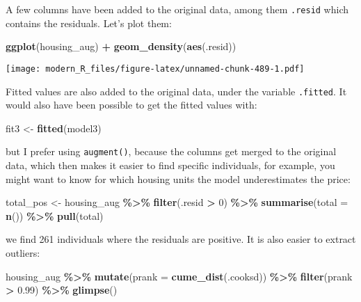 \documentclass[
]{article}
\newenvironment{Shaded}{\begin{snugshade}}{\end{snugshade}}
\newcommand{\DataTypeTok}[1]{\textcolor[rgb]{0.13,0.29,0.53}{#1}}
\newcommand{\DecValTok}[1]{\textcolor[rgb]{0.00,0.00,0.81}{#1}}
\newcommand{\FloatTok}[1]{\textcolor[rgb]{0.00,0.00,0.81}{#1}}
\newcommand{\KeywordTok}[1]{\textcolor[rgb]{0.13,0.29,0.53}{\textbf{#1}}}
\newcommand{\NormalTok}[1]{#1}
\newcommand{\OperatorTok}[1]{\textcolor[rgb]{0.81,0.36,0.00}{\textbf{#1}}}
\newcommand{\StringTok}[1]{\textcolor[rgb]{0.31,0.60,0.02}{#1}}
\begin{document}
A few columns have been added to the original data, among them \texttt{.resid} which contains the
residuals. Let's plot them:

\begin{Shaded}
\begin{Highlighting}[]
\KeywordTok{ggplot}\NormalTok{(housing\_aug) }\OperatorTok{+}
\StringTok{  }\KeywordTok{geom\_density}\NormalTok{(}\KeywordTok{aes}\NormalTok{(.resid))}
\end{Highlighting}
\end{Shaded}

\texttt{[image: modern\_R\_files/figure-latex/unnamed-chunk-489-1.pdf]}

Fitted values are also added to the original data, under the variable \texttt{.fitted}. It would also have
been possible to get the fitted values with:

\begin{Shaded}
\begin{Highlighting}[]
\NormalTok{fit3 \textless{}{-}}\StringTok{ }\KeywordTok{fitted}\NormalTok{(model3)}
\end{Highlighting}
\end{Shaded}

but I prefer using \texttt{augment()}, because the columns get merged to the original data, which then
makes it easier to find specific individuals, for example, you might want to know for which housing
units the model underestimates the price:

\begin{Shaded}
\begin{Highlighting}[]
\NormalTok{total\_pos \textless{}{-}}\StringTok{ }\NormalTok{housing\_aug }\OperatorTok{\%\textgreater{}\%}
\StringTok{  }\KeywordTok{filter}\NormalTok{(.resid }\OperatorTok{\textgreater{}}\StringTok{ }\DecValTok{0}\NormalTok{) }\OperatorTok{\%\textgreater{}\%}
\StringTok{  }\KeywordTok{summarise}\NormalTok{(}\DataTypeTok{total =} \KeywordTok{n}\NormalTok{()) }\OperatorTok{\%\textgreater{}\%}
\StringTok{  }\KeywordTok{pull}\NormalTok{(total)}
\end{Highlighting}
\end{Shaded}

we find 261 individuals where the residuals are positive. It is also easier to
extract outliers:

\begin{Shaded}
\begin{Highlighting}[]
\NormalTok{housing\_aug }\OperatorTok{\%\textgreater{}\%}
\StringTok{  }\KeywordTok{mutate}\NormalTok{(}\DataTypeTok{prank =} \KeywordTok{cume\_dist}\NormalTok{(.cooksd)) }\OperatorTok{\%\textgreater{}\%}
\StringTok{  }\KeywordTok{filter}\NormalTok{(prank }\OperatorTok{\textgreater{}}\StringTok{ }\FloatTok{0.99}\NormalTok{) }\OperatorTok{\%\textgreater{}\%}
\StringTok{  }\KeywordTok{glimpse}\NormalTok{()}
\end{Highlighting}
\end{Shaded}
\end{document}

